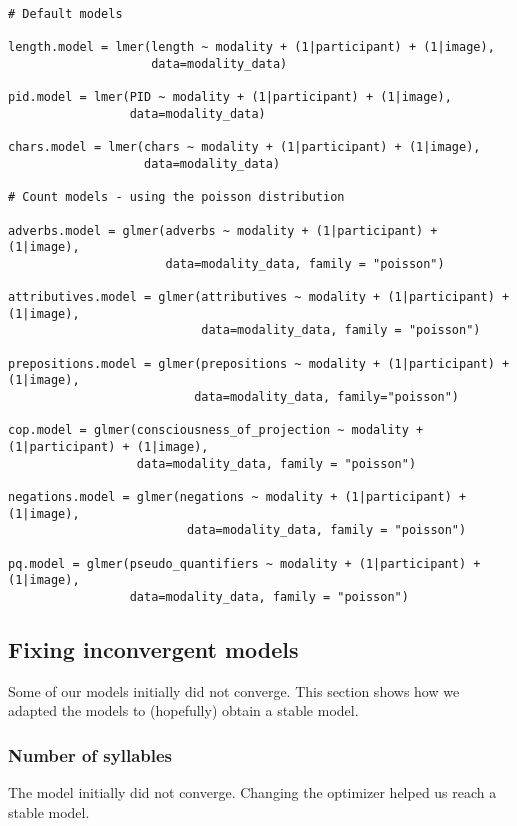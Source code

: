 \documentclass[11pt]{article}
\begin{document}
\noindent \begin{minipage}[c]{\textwidth}
\begin{lstlisting}
# Default models

length.model = lmer(length ~ modality + (1|participant) + (1|image), 
                    data=modality_data)

pid.model = lmer(PID ~ modality + (1|participant) + (1|image), 
                 data=modality_data)

chars.model = lmer(chars ~ modality + (1|participant) + (1|image), 
                   data=modality_data)

# Count models - using the poisson distribution

adverbs.model = glmer(adverbs ~ modality + (1|participant) + (1|image), 
                      data=modality_data, family = "poisson")

attributives.model = glmer(attributives ~ modality + (1|participant) + (1|image), 
                           data=modality_data, family = "poisson")

prepositions.model = glmer(prepositions ~ modality + (1|participant) + (1|image), 
                          data=modality_data, family="poisson")

cop.model = glmer(consciousness_of_projection ~ modality + (1|participant) + (1|image), 
                  data=modality_data, family = "poisson")

negations.model = glmer(negations ~ modality + (1|participant) + (1|image), 
                         data=modality_data, family = "poisson")

pq.model = glmer(pseudo_quantifiers ~ modality + (1|participant) + (1|image), 
                 data=modality_data, family = "poisson")
\end{lstlisting}
\end{minipage}

\subsection{Fixing inconvergent models}
Some of our models initially did not converge. This section shows how we adapted the models to (hopefully) obtain a stable model.

\subsubsection{Number of syllables}
The model initially did not converge. Changing the optimizer helped us reach a stable model.
\end{document}
